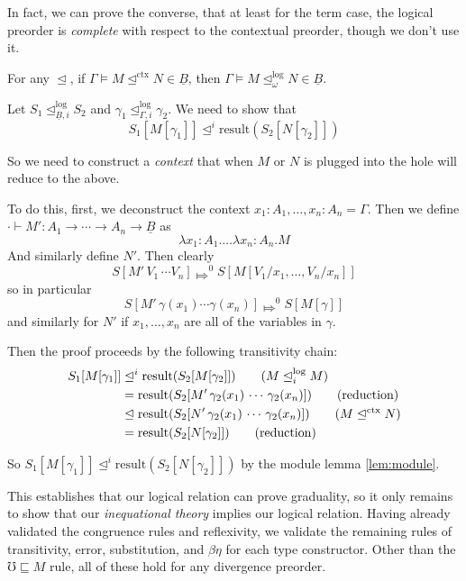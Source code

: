 \documentclass[acmsmall,screen,12pt]{acmart}
\renewcommand{\u}{\underline}
\newcommand{\ltdyn}{\sqsubseteq}
\newcommand{\apreorder}{\trianglelefteq}
\newcommand{\ctxize}[1]{\mathrel{{#1}^{\text{ctx}}}}
\newcommand{\ix}[2]{\mathrel{#1^{#2}}}
\newcommand{\itylrof}[3]{\ilrof{#1}{#3,#2}}
\newcommand{\ilrof}[2]{\mathrel{{#1}^{\text{log}}_{#2}}}
\newcommand{\itylr}[2]{\itylrof{\apreorder}{#1}{#2}}
\newcommand{\ilr}[1]{\ilrof{\apreorder}{#1}}
\newcommand{\bigstepsin}[1]{\mathrel{\Mapsto^{#1}}}
\newcommand{\err}{\mho}
\newcommand{\result}{\text{result}}
\begin{document}
{\begin{longonly}
In fact, we can prove the converse, that at least for the term case,
the logical preorder is \emph{complete} with respect to the contextual
preorder, though we don't use it.
\begin{lemma}
  For any $\apreorder$, if $\Gamma \vDash M \ctxize \apreorder N \in
  \u B$, then $\Gamma \vDash M \ilrof\apreorder \omega N \in \u B$.
\end{lemma}
\begin{longproof}
  Let $S_1 \itylr i {\u B} S_2$ and $\gamma_1 \itylr i \Gamma \gamma_2$. We need to show that
  \[
  S_1[M[\gamma_1]] \ix\apreorder i \result(S_2[N[\gamma_2]])
  \]

  So we need to construct a \emph{context} that when $M$ or $N$ is
  plugged into the hole will reduce to the above.

  To do this, first, we deconstruct the context
  $x_1:A_1,\ldots,x_n:A_n = \Gamma$.  Then we define $\cdot \vdash M'
  : A_1\to \cdots \to A_n \to \u B$ as
  \[ \lambda x_1:A_1.\ldots\lambda x_n:A_n. M \]
  And similarly define $N'$. Then clearly
  \[ S[M' \,V_1\, \cdots V_n] \bigstepsin{0} S[M[V_1/x_1,\ldots,V_n/x_n]] \]
  so in particular
  \[ S[M'\,\gamma(x_1)\cdots\gamma(x_n)] \bigstepsin{0} S[M[\gamma]]\]
  and similarly for $N'$ if $x_1,\ldots,x_n$ are all of the variables
  in $\gamma$.

  Then the proof proceeds by the following transitivity chain:
  \begin{align*}
    S_1[M[\gamma_1]] &\ix\apreorder i \result(S_2[M[\gamma_2]])\tag{$M \ilr i M$}\\
    &=\result(S_2[M'\,\gamma_2(x_1)\,\cdots\,\gamma_2(x_n)])\tag{reduction}\\
    &\apreorder \result(S_2[N'\,\gamma_2(x_1)\,\cdots\,\gamma_2(x_n)])\tag{$M \ctxize\apreorder N$}\\
    &= \result(S_2[N[\gamma_2]])\tag{reduction}
  \end{align*}

  So $S_1[M[\gamma_1]] \ix\apreorder i \result(S_2[N[\gamma_2]])$ by
  the module lemma \ref{lem:module}.
\end{longproof}
\end{longonly}

This establishes that our logical relation can prove graduality, so it
only remains to show that our \emph{inequational theory} implies our
logical relation.
%
Having already validated the congruence rules and reflexivity, we
validate the remaining rules of transitivity, error, substitution, and
$\beta\eta$ for each type constructor.
%
Other than the $\err \ltdyn M$ rule, all of these hold for any
divergence preorder.

}
\end{document}
